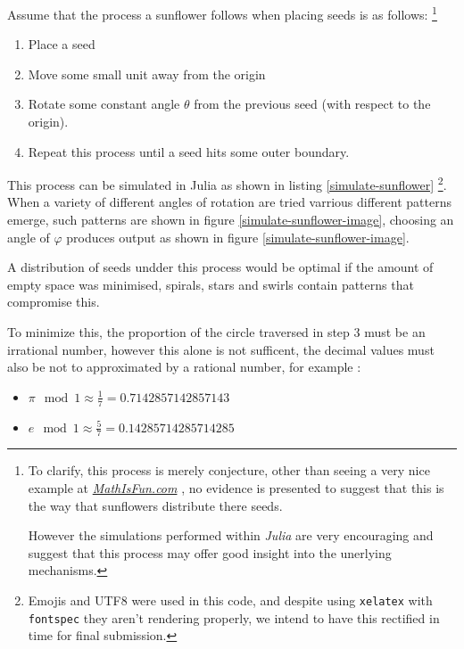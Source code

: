 \documentclass[a4paper,11pt,twoside]{article}
\begin{document}
Assume that the process a sunflower follows when placing seeds is as follows: \footnote{To clarify, this process is merely conjecture, other than seeing a very nice example at \href{https://www.mathsisfun.com/numbers/nature-golden-ratio-fibonacci.html}{\emph{MathIsFun.com}}
\cite{NatureGoldenRatio2018}, no evidence is presented to suggest that this is the way
that sunflowers distribute there seeds.

However the simulations performed within \emph{Julia} are very encouraging and
suggest that this process may offer good insight into the unerlying mechanisms.}

\begin{enumerate}
\item Place a seed
\item Move some small unit away from the origin
\item Rotate some constant angle \(\mathtt{\theta}\)  from the previous seed (with respect to the origin).
\item Repeat this process until a seed hits some outer boundary.
\end{enumerate}

This process can be simulated in Julia as shown in listing
\ref{simulate-sunflower} \footnote{Emojis and UTF8 were used in this code, and despite using \texttt{xelatex} with \texttt{fontspec} they aren't rendering properly, we intend to have this rectified in time for final submission.}. When a variety of different angles of rotation are
tried varrious different patterns emerge, such patterns are shown in figure \ref{simulate-sunflower-image}, choosing an angle of \(\varphi\) produces output as shown in figure \ref{simulate-sunflower-image}.

A distribution of seeds undder this process would be optimal if the amount of empty space was minimised, spirals, stars and swirls contain patterns that compromise this.

To minimize this, the proportion of the circle traversed in step 3 must be an
irrational number, however this alone is not sufficent, the decimal values must
also be not to approximated by a rational number, for example
\cite{NatureGoldenRatio2018}:

\begin{itemize}
\item \(\pi \mod 1 \approx \frac{1}{7}=0.7142857142857143\)
\item \(e \mod 1 \approx \frac{5}{7}= 0.14285714285714285\)
\end{itemize}
\end{document}
